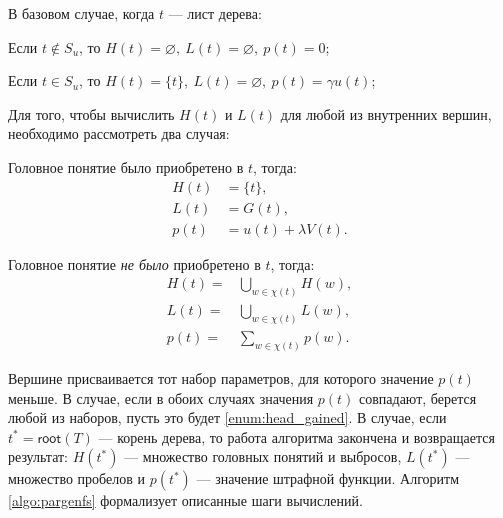 \documentclass[12pt]{article}
\renewcommand{\emptyset}{\varnothing}
\newenvironment{itemize*}%
{\begin{itemize}%
	\setlength{\itemsep}{0pt}%
	\setlength{\parskip}{0pt}}%
{\end{itemize}}
\newenvironment{alphaenumerate*}
{\begin{enumerate}[label=(\asbuk*), ref=(\asbuk*)]
	\setlength{\itemsep}{0pt}
	\setlength{\parskip}{0pt}}
{\end{enumerate}}
\renewcommand{\cup}{\bigcup}
\begin{document}
В базовом случае, когда $t$ --- лист дерева:

\begin{itemize*}
	\item Если $t\notin S_u$, то $H(t)=\emptyset, \ L(t)=\emptyset,\ p(t)=0$;
	\item Если $t\in S_u$, то $H(t)=\{t\}, \ L(t)=\emptyset,\ p(t)=\gamma u(t)$;
\end{itemize*}

Для того, чтобы вычислить $H(t)$ и $L(t)$ для любой из внутренних вершин, необходимо рассмотреть два случая:
\begin{alphaenumerate*}
	\item\label{enum:head_gained} Головное понятие было приобретено в $t$, тогда:
	\begin{equation}
		\begin{aligned}
			H(t) &=\{t\},\\
			L(t)&=G(t), \\
			p(t)& = u(t) + \lambda V(t).
		\end{aligned}
	\end{equation}
	\item Головное понятие \emph{не было} приобретено в $t$, тогда:
	\begin{equation}
		\begin{aligned}
			H(t)=&\cup_{w\in \chi(t)} H(w),\\
			L(t)=&\cup_{w\in \chi(t)} L(w), \\
			p(t) =& \sum_{w\in \chi(t)}p(w).
		\end{aligned}
	\end{equation}
\end{alphaenumerate*}

Вершине присваивается тот набор параметров, для которого значение $p(t)$ меньше. В случае, если в обоих случаях значения $p(t)$ совпадают, берется любой из наборов, пусть это будет \ref{enum:head_gained}. В случае, если $t^*=\textsf{root}(T)$ --- корень дерева, то работа алгоритма закончена и возвращается результат: $H(t^*)$ --- множество головных понятий и выбросов, $L(t^*)$ --- множество пробелов и $p(t^*)$ --- значение штрафной функции. Алгоритм \ref{algo:pargenfs} формализует описанные шаги вычислений.
\end{document}
